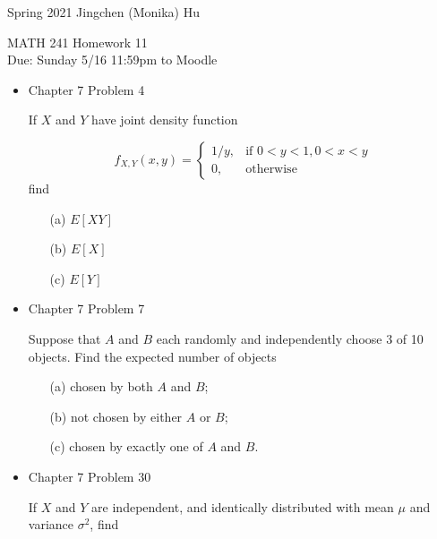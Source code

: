 \documentclass[11pt]{article}
\begin{document}
\enlargethispage{\baselineskip}

Spring 2021 \hfill Jingchen (Monika) Hu\\

\begin{center}
{\huge MATH 241 Homework 11}	\\
Due: Sunday 5/16 11:59pm to Moodle
\end{center}
\vspace{0.5cm}

\begin{itemize}

    \item
    Chapter 7 Problem 4
    
    If $X$ and $Y$ have joint density function 
    
     \begin{equation*}
    f_{X, Y}(x, y) =
    \begin{cases}
      1/y, & \text{if $0 < y < 1, 0 < x < y$} \\
      0, & \text{otherwise}
    \end{cases}
  \end{equation*}
  find
  
  \begin{itemize}
  \item[(a)] $E[XY]$
  \item[(b)] $E[X]$
  \item[(c)] $E[Y]$
  \end{itemize}
  
  
    \item
    Chapter 7 Problem 7
    
    Suppose that $A$ and $B$ each randomly and independently choose 3 of 10 objects. Find the expected number of objects
    
    \begin{itemize}
    \item[(a)] chosen by both $A$ and $B$;
    \item[(b)] not chosen by either $A$ or $B$;
    \item[(c)] chosen by exactly one of $A$ and $B$. 
    \end{itemize}

    \item
    Chapter 7 Problem 30
    
    If $X$ and $Y$ are independent, and identically distributed with mean $\mu$ and variance $\sigma^2$, find
    

\end{itemize}
\end{document}
